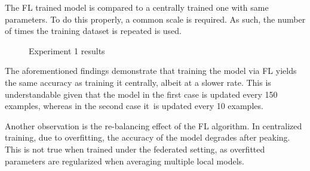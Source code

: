 The FL trained model is compared to a centrally trained one with same parameters. To do this properly, a common scale is required. As such, the number of times the training dataset is repeated is used.
\begin{figure}[H]
    \center
    
    \caption[Experiment 1 results]{Experiment 1 results}
    \label{fig:Experiment 1 results}
\end{figure}
The aforementioned findings demonstrate that training the model via FL yields the same accuracy as training it centrally, albeit at a slower rate. This is understandable given that the model in the first case is updated every 150 examples, whereas in the second case it is updated every 10 examples.

Another observation is the re-balancing effect of the FL algorithm. In centralized training, due to overfitting, the accuracy of the model degrades after peaking. This is not true when trained under the federated setting, as overfitted parameters are regularized when averaging multiple local models.

